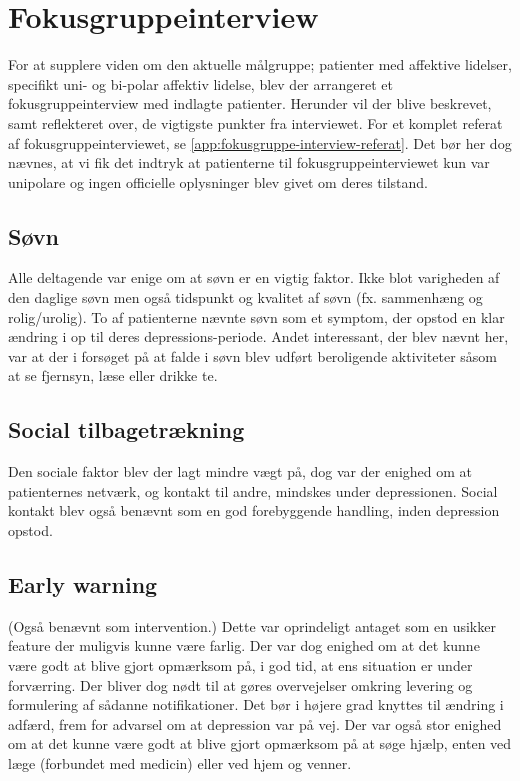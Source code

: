 \section{Fokusgruppeinterview}
For at supplere viden om den aktuelle målgruppe; patienter med affektive lidelser, specifikt uni- og bi-polar affektiv lidelse, blev der arrangeret et fokusgruppeinterview med indlagte patienter.
Herunder vil der blive beskrevet, samt reflekteret over, de vigtigste punkter fra interviewet.
For et komplet referat af fokusgruppeinterviewet, se \cref{app:fokusgruppe-interview-referat}.
Det bør her dog nævnes, at vi fik det indtryk at patienterne til fokusgruppeinterviewet kun var unipolare og ingen officielle oplysninger blev givet om deres tilstand.

\subsection{Søvn}
Alle deltagende var enige om at søvn er en vigtig faktor.
Ikke blot varigheden af den daglige søvn men også tidspunkt og kvalitet af søvn (fx. sammenhæng og rolig/urolig).
To af patienterne nævnte søvn som et symptom, der opstod en klar ændring i op til deres depressions-periode.
Andet interessant, der blev nævnt her, var at der i forsøget på at falde i søvn blev udført beroligende aktiviteter såsom at se fjernsyn, læse eller drikke te.

\subsection{Social tilbagetrækning}
Den sociale faktor blev der lagt mindre vægt på, dog var der enighed om at patienternes netværk, og kontakt til andre, mindskes under depressionen.
Social kontakt blev også benævnt som en god forebyggende handling, inden depression opstod.

\subsection{Early warning}
(Også benævnt som intervention.)
Dette var oprindeligt antaget som en usikker feature der muligvis kunne være farlig.
Der var dog enighed om at det kunne være godt at blive gjort opmærksom på, i god tid, at ens situation er under forværring.
Der bliver dog nødt til at gøres overvejelser omkring levering og formulering af sådanne notifikationer.
Det bør i højere grad knyttes til ændring i adfærd, frem for advarsel om at depression var på vej.
Der var også stor enighed om at det kunne være godt at blive gjort opmærksom på at søge hjælp, enten ved læge (forbundet med medicin) eller ved hjem og venner.

